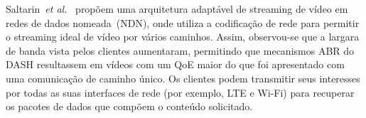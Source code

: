 
Saltarin~\textit{et al.}~\cite{saltarinTrans2017} propõem uma arquitetura adaptável de streaming de vídeo em redes de dados nomeada~(NDN), onde utiliza a codificação de rede para permitir o streaming ideal de vídeo por vários caminhos. Assim, observou-se que a largara de banda vista pelos clientes aumentaram,
permitindo que mecanismos ABR do DASH resultassem em vídeos com um QoE maior do que foi apresentado com uma comunicação de caminho único.
Os clientes podem transmitir seus interesses por todas as suas interfaces de rede (por exemplo, LTE e Wi-Fi) para recuperar os pacotes de dados que compõem o conteúdo solicitado.


